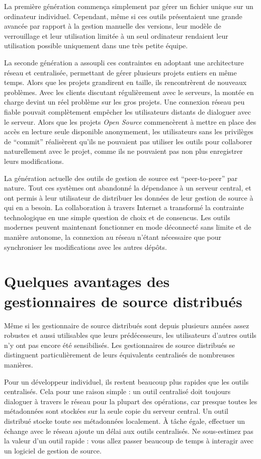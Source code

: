 La première génération commença simplement par gérer un fichier unique sur un
ordinateur individuel. Cependant, même si ces outils présentaient une grande
avancée par rapport à la gestion manuelle des versions, leur modèle de
verrouillage et leur utilisation limitée à un seul ordinateur rendaient leur
utilisation possible uniquement dans une très petite équipe. 

La seconde génération a assoupli ces contraintes en adoptant une architecture
réseau et centralisée, permettant de gérer plusieurs projets entiers en même
temps. Alors que les projets grandirent en taille, ils rencontrèrent de nouveaux
problèmes. Avec les clients discutant régulièrement avec le serveurs, la montée
en charge devint un réel problème sur les gros projets. Une connexion réseau
peu fiable pouvait complètement empêcher les utilisateurs distants de dialoguer
avec le serveur. Alors que les projets \textit{Open Source} commencèrent à
mettre en place des accès en lecture seule disponible anonymement, les
utilisateurs sans les privilèges de ``commit'' réalisèrent qu'ils ne pouvaient
pas utiliser les outils pour collaborer naturellement avec le projet, comme ils
ne pouvaient pas non plus enregistrer leurs modifications.

La génération actuelle des outils de gestion de source est ``peer-to-peer'' par
nature. Tout ces systèmes ont abandonné la dépendance à un serveur central, et
ont permis à leur utilisateur de distribuer les données de leur gestion de
source à qui en a besoin. La collaboration à travers Internet a transformé la
contrainte technologique en une simple question de choix et de consencus. Les
outils modernes peuvent maintenant fonctionner en mode déconnecté sans limite et
de manière autonome, la connexion au réseau n'étant nécessaire que pour
synchroniser les modifications avec les autres dépôts.

\section{Quelques avantages des gestionnaires de source distribués}

Même si les gestionnaire de source distribués sont depuis plusieurs années
assez robustes et aussi utilisables que leurs prédécesseurs, les utilisateurs
d'autres outils n'y ont pas encore été sensibilisés. Les gestionnaires
de source distribués se distinguent particulièrement de leurs équivalents
centralisés de nombreuses manières.

Pour un développeur individuel, ils restent beaucoup plus rapides que les
outils centralisés. Cela pour une raison simple : un outil centralisé doit
toujours dialoguer à travers le réseau pour la plupart des opérations, car
presque toutes les métadonnées sont stockées sur la seule copie du serveur
central. Un outil distribué stocke toute ses métadonnées localement. À tâche
égale, effectuer un échange avec le réseau ajoute un délai aux outils 
centralisés. Ne sous-estimez pas la valeur d'un outil rapide : vous allez
passer beaucoup de temps à interagir avec un logiciel de gestion de source.

